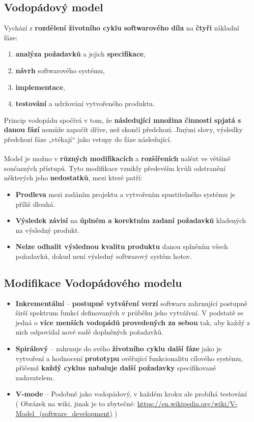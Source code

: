 \subsection{Vodopádový model}
Vychází z \textbf{rozdělení životního cyklu softwarového díla} na \textbf{čtyři} základní fáze:
\begin{enumerate}
    \item \textbf{analýza požadavků} a jejich \textbf{specifikace},
    \item \textbf{návrh} softwarového systému,
    \item \textbf{implementace},
    \item \textbf{testování} a udržování vytvořeného produktu.
\end{enumerate}
Princip vodopádu spočívá v tom, že \textbf{následující množina činností spjatá s danou fází} nemůže započít dříve, než skončí předchozí. Jinými slovy, výsledky předchozí fáze „vtékají“ jako vstupy do fáze následující.
\\\\
\noindent{}
Model je možno v \textbf{různých modifikacích} a \textbf{rozšířeních} nalézt ve většině současných přístupů. Tyto modifikace vznikly především kvůli odstranění některých jeho \textbf{nedostatků}, mezi které patří:
\begin{itemize}
    \item \textbf{Prodleva} mezi zadáním projektu a vytvořením spustitelného systému je příliš dlouhá.
    \item \textbf{Výsledek závisí} na \textbf{úplném a korektním zadaní požadavků} kladených na výsledný produkt.
    \item \textbf{Nelze odhalit výslednou kvalitu produktu} danou splněním všech požadavků, dokud není výsledný softwarový systém hotov.
\end{itemize}

\subsection{Modifikace Vodopádového modelu}
\begin{itemize}
    \item \textbf{Inkrementální} -- \textbf{postupné vytváření verzí} softwaru zahrnující postupně širší spektrum funkcí definovaných v průběhu jeho vytváření. V podstatě se jedná o \textbf{více menších vodopádů provedených za sebou} tak, aby každý z nich odpovídal nové sadě doplněných požadavků.
    \item \textbf{Spirálový} -- zahrnuje do svého \textbf{životního cyklu další fáze} jako je vytvoření a hodnocení \textbf{prototypu} ověřující funkcionalitu cílového systému, přičemž \textbf{každý cyklus nabaluje další požadavky} specifikované zadavatelem.
    \item \textbf{V-mode} -- Podobně jako vodopádový, v každém kroku ale probíhá testování ( Obrázek na wiki, jinak je to zbytečné: \url{https://en.wikipedia.org/wiki/V-Model_(software_development)} )
\end{itemize}


